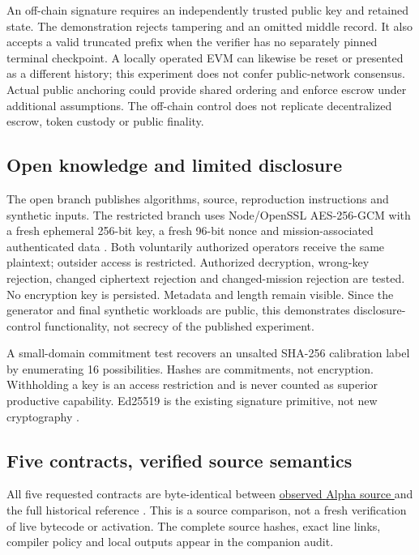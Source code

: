 An off-chain signature requires an independently trusted public key and retained state. The demonstration rejects tampering and an omitted middle record. It also accepts a valid truncated prefix when the verifier has no separately pinned terminal checkpoint. A locally operated EVM can likewise be reset or presented as a different history; this experiment does not confer public-network consensus. Actual public anchoring could provide shared ordering and enforce escrow under additional assumptions. The off-chain control does not replicate decentralized escrow, token custody or public finality.


\subsection{Open knowledge and limited disclosure}
The open branch publishes algorithms, source, reproduction instructions and synthetic inputs. The restricted branch uses Node/OpenSSL AES-256-GCM with a fresh ephemeral 256-bit key, a fresh 96-bit nonce and mission-associated authenticated data \citep{dworkin2007}. Both voluntarily authorized operators receive the same plaintext; outsider access is restricted. Authorized decryption, wrong-key rejection, changed ciphertext rejection and changed-mission rejection are tested. No encryption key is persisted. Metadata and length remain visible. Since the generator and final synthetic workloads are public, this demonstrates disclosure-control functionality, not secrecy of the published experiment.

A small-domain commitment test recovers an unsalted SHA-256 calibration label by enumerating 16 possibilities. Hashes are commitments, not encryption. Withholding a key is an access restriction and is never counted as superior productive capability. Ed25519 is the existing signature primitive, not new cryptography \citep{rfc8032}.

\subsection{Five contracts, verified source semantics}
All five requested contracts are byte-identical between \href{https://github.com/MontrealAI/AGI-Alpha-Agent-v0/tree/197147ffd22c5ae13113162afffaf3ce9c10aa2e/contracts/ascension}{observed Alpha source } and the full historical reference . This is a source comparison, not a fresh verification of live bytecode or activation. The complete source hashes, exact line links, compiler policy and local outputs appear in the companion audit.

